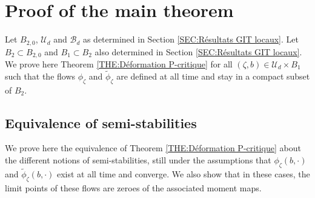 \documentclass{article}
\theoremstyle{remark}
\theoremstyle{definition}
\newcommand{\mB}{\mathcal{B}}
\newcommand{\mU}{\mathcal{U}}
\begin{document}
\section{Proof of the main theorem}\label{SEC:Preuve du théorème}

Let $B_{2,0}$, $\mU_d$ and $\mB_d$ as determined in Section \ref{SEC:Résultats GIT locaux}. Let $B_2 \subset B_{2,0}$ and $B_1 \subset B_2$ also determined in Section \ref{SEC:Résultats GIT locaux}. We prove here Theorem \ref{THE:Déformation P-critique} for all $(\zeta,b) \in \mU_d \times B_1$ such that the flows $\phi_\zeta$ and $\tilde{\phi}_\zeta$ are defined at all time and stay in a compact subset of $B_2$.

\subsection{Equivalence of semi-stabilities}\label{SEC:Equivalence semi-stabilités}

We prove here the equivalence of Theorem \ref{THE:Déformation P-critique} about the different notions of semi-stabilities, still under the assumptions that $\phi_\zeta(b,\cdot)$ and $\tilde{\phi}_\zeta(b,\cdot)$ exist at all time and converge. We also show that in these cases, the limit points of these flows are zeroes of the associated moment maps.\\
\end{document}
